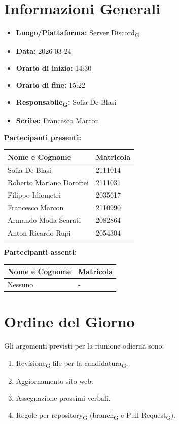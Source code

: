 \section{Informazioni Generali}
\begin{itemize}
	\item \textbf{Luogo/Piattaforma:} Server Discord\textsubscript{G}
	\item \textbf{Data:} 2026-03-24
	\item \textbf{Orario di inizio:} 14:30
	\item \textbf{Orario di fine:} 15:22
	\item \textbf{Responsabile\textsubscript{G}:} Sofia De Blasi
	\item \textbf{Scriba:} Francesco Marcon
\end{itemize}

\vspace{0.5cm}
\textbf{Partecipanti presenti:}
\begin{table}[ht]
	\centering
	\renewcommand{\arraystretch}{1.2}
	\begin{tabularx}{\textwidth}{X l}
		\toprule
		\textbf{Nome e Cognome} & \textbf{Matricola} \\
		\midrule
		Sofia De Blasi & 2111014 \\
		Roberto Mariano Doroftei & 2111031 \\
		Filippo Idiometri & 2035617 \\
		Francesco Marcon & 2110990 \\
		Armando Moda Scarati & 2082864 \\
		Anton Ricardo Rupi & 2054304 \\
		\bottomrule
	\end{tabularx}
\end{table}

\vspace{0.5cm}
\textbf{Partecipanti assenti:}
\begin{table}[ht]
	\centering
	\renewcommand{\arraystretch}{1.2}
	\begin{tabularx}{\textwidth}{X l}
		\toprule
		\textbf{Nome e Cognome} & \textbf{Matricola} \\
		\midrule
		Nessuno & - \\
		\bottomrule
	\end{tabularx}
\end{table}

\section{Ordine del Giorno}
Gli argomenti previsti per la riunione odierna sono:
\begin{enumerate}
	\item Revisione\textsubscript{G} file per la candidatura\textsubscript{G}.
	\item Aggiornamento sito web.
	\item Assegnazione prossimi verbali.
	\item Regole per repository\textsubscript{G} (branch\textsubscript{G} e Pull Request\textsubscript{G}).
\end{enumerate}
\newpage
